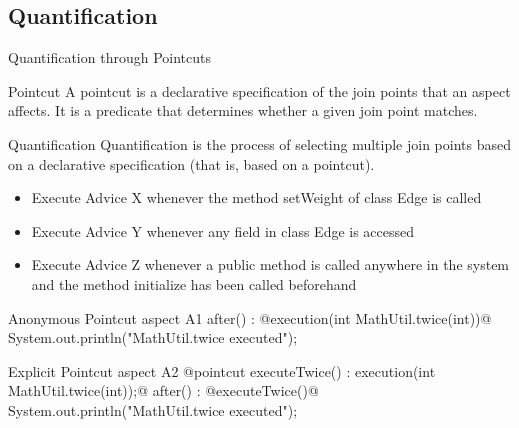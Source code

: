 \subsection{Quantification}

\begin{frame}[fragile]{Quantification through Pointcuts}
	\begin{mycolumns}[widths={50,50},animation=none]
		\begin{definition}{Pointcut }
			A pointcut is a declarative specification of the join points that an aspect affects. It is a predicate that determines whether a given join point matches.
		\end{definition}
		\begin{definition}{Quantification }
			Quantification is the process of selecting multiple join points based on a declarative specification (that is, based on a pointcut).
		\end{definition}
		\begin{example}{}
			\begin{itemize}
				\item Execute Advice X whenever the method setWeight of class Edge is called
				\item Execute Advice Y whenever any field in class Edge is accessed
				\item Execute Advice Z whenever a public method is called anywhere in the system and the method initialize has been called beforehand
			\end{itemize}
		\end{example}
	\mynextcolumn
{\small
\begin{codetight}{Anonymous Pointcut}
aspect A1 {
	after() : @execution(int MathUtil.twice(int))@ {
		System.out.println("MathUtil.twice executed");
	}
}
\end{codetight}			
\begin{codetight}{Explicit Pointcut}
aspect A2 {
	@pointcut executeTwice() : 
			execution(int MathUtil.twice(int));@
	after() : @executeTwice()@ {
		System.out.println("MathUtil.twice executed");
	}
}
\end{codetight}	
}
	\end{mycolumns}
\end{frame}

